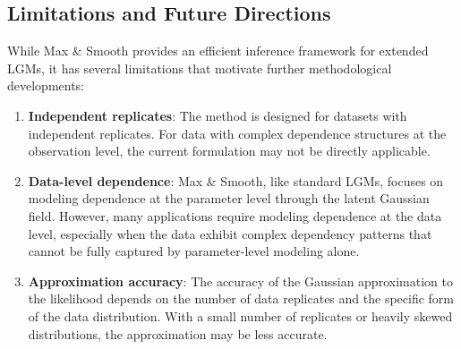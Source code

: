 \subsection{Limitations and Future Directions} \label{subsec:limitations}
While Max \& Smooth provides an efficient inference framework for extended LGMs, it has several limitations that motivate further methodological developments:

\begin{enumerate}
    \item \textbf{Independent replicates}: The method is designed for datasets with independent replicates. For data with complex dependence structures at the observation level, the current formulation may not be directly applicable.

    \item \textbf{Data-level dependence}: Max \& Smooth, like standard LGMs, focuses on modeling dependence at the parameter level through the latent Gaussian field. However, many applications require modeling dependence at the data level, especially when the data exhibit complex dependency patterns that cannot be fully captured by parameter-level modeling alone.

    \item \textbf{Approximation accuracy}: The accuracy of the Gaussian approximation to the likelihood depends on the number of data replicates and the specific form of the data distribution. With a small number of replicates or heavily skewed distributions, the approximation may be less accurate.
\end{enumerate} 